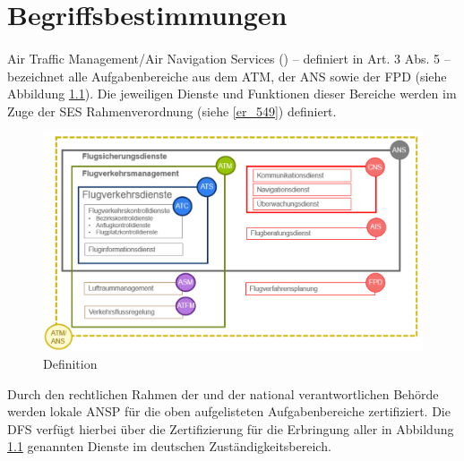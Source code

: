 \chapter{Begriffsbestimmungen}
\subsubsection{\atmansf} \label{beg:atmans}
    
    Air Traffic Management/Air Navigation Services (\atmans) -- definiert in  Art. 3 Abs. 5 -- bezeichnet alle Aufgabenbereiche aus dem \acf{ATM}, der \acf{ANS} sowie der \acf{FPD} (siehe Abbildung \ref{fig:atmans}).
    Die jeweiligen Dienste und Funktionen dieser Bereiche werden im Zuge der \ac{SES} Rahmenverordnung (siehe \ref{er_549}) definiert.
    
    \begin{figure}[h!]
        \centering
        \includegraphics[width=\linewidth]{gfx/atmans.png}
        \caption{\atmansf{} Definition \cite{ba_technik}}
        \label{fig:atmans}
    \end{figure}

    \noindent
    Durch den rechtlichen Rahmen der  und der national verantwortlichen Behörde werden lokale \acf{ANSP} für die oben aufgelisteten Aufgabenbereiche zertifiziert.
    Die \ac{DFS} verfügt hierbei über die Zertifizierung für die Erbringung aller in Abbildung \ref{fig:atmans} genannten \atmans{} Dienste im deutschen Zuständigkeitsbereich. \cite[vgl.][17]{ba_technik}
    
